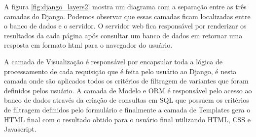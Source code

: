 A figura \ref{fig:django_layers2} mostra um diagrama com a separação entre as três camadas do Django. Podemos observar que essas camadas ficam localizadas entre o banco de dados e o servidor. O servidor web fica responsável por renderizar os resultados da cada página após consultar um banco de dados em retornar uma resposta em formato html para o navegador do usuário.


A camada de Visualização é responsável por encapsular toda a lógica de processamento de cada requisição que é feita pelo usuário ao Django, é nesta camada onde são aplicados todos os critérios de filtragem de variantes que foram definidos pelos usuário. A camada de Modelo e ORM é responsável pelo acesso ao banco de dados através da criação de consultas em SQL que possuem os critérios de filtragem definidos pelo formulário e finalmente a camada de Templates gera o HTML final com o resultado obtido para o usuário final utilizando HTML, CSS e Javascript. 

